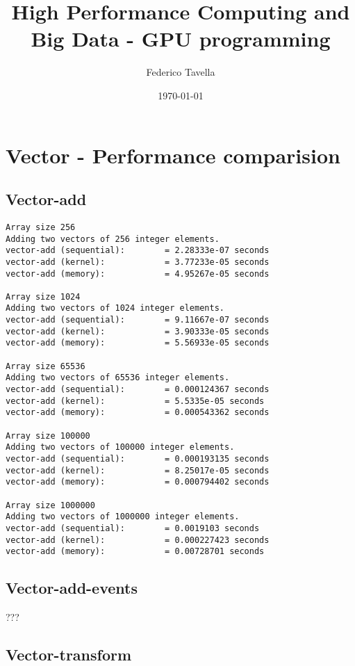 \documentclass[a4paper]{article}
\title{High Performance Computing and Big Data - GPU programming}
\author{Federico Tavella}
\date{\today}
\begin{document}
\maketitle

\section{Vector - Performance comparision}

\subsection{Vector-add}

\begin{verbatim}
Array size 256
Adding two vectors of 256 integer elements.
vector-add (sequential): 		= 2.28333e-07 seconds
vector-add (kernel): 		  	= 3.77233e-05 seconds
vector-add (memory): 		  	= 4.95267e-05 seconds

Array size 1024
Adding two vectors of 1024 integer elements.
vector-add (sequential): 		= 9.11667e-07 seconds
vector-add (kernel): 		  	= 3.90333e-05 seconds
vector-add (memory): 		  	= 5.56933e-05 seconds

Array size 65536
Adding two vectors of 65536 integer elements.
vector-add (sequential): 	 	= 0.000124367 seconds
vector-add (kernel): 		  	= 5.5335e-05 seconds
vector-add (memory): 		  	= 0.000543362 seconds

Array size 100000
Adding two vectors of 100000 integer elements.
vector-add (sequential): 		= 0.000193135 seconds
vector-add (kernel): 		  	= 8.25017e-05 seconds
vector-add (memory): 		    = 0.000794402 seconds

Array size 1000000
Adding two vectors of 1000000 integer elements.
vector-add (sequential): 		= 0.0019103 seconds
vector-add (kernel): 		  	= 0.000227423 seconds
vector-add (memory): 		  	= 0.00728701 seconds
\end{verbatim}

\subsection{Vector-add-events}

???

\subsection{Vector-transform}
\end{document}

